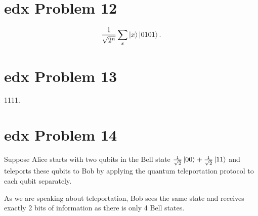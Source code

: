 \documentclass[10pt]{article}
\begin{document}
\section*{edx Problem 12}
\[
\frac{1}{\sqrt{2^n}} \sum_{x} \ket{x} \ket{0101}. 
\]

\section*{edx Problem 13}
1111.

\section*{edx Problem 14}
Suppose Alice starts with two qubits in the Bell state $\frac{1}{\sqrt{2}} \ket{00} + \frac{1}{\sqrt{2}} \ket{11}$ and teleports these qubits to Bob by applying the quantum teleportation protocol to each qubit separately.

As we are speaking about teleportation, Bob sees the same state and receives exactly 2 bits of information as there is only 4 Bell states.
\end{document}

